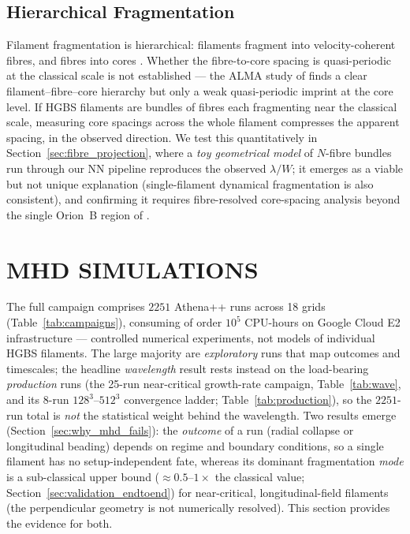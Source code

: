 \documentclass[usenatbib,twoside,twocolumn]{mnras}
\begin{document}
\subsection{Hierarchical Fragmentation}

Filament fragmentation is hierarchical: filaments fragment into velocity-coherent fibres, and fibres into cores \citep{Hacar2013,Hacar2018,Yang2024}. Whether the fibre-to-core spacing is quasi-periodic at the classical scale is not established --- the ALMA study of \citet{Yang2024} finds a clear filament--fibre--core hierarchy but only a weak quasi-periodic imprint at the core level. If HGBS filaments are bundles of fibres each fragmenting near the classical scale, measuring core spacings across the whole filament compresses the apparent spacing, in the observed direction. We test this quantitatively in Section~\ref{sec:fibre_projection}, where a \emph{toy geometrical model} of $N$-fibre bundles run through our NN pipeline reproduces the observed $\lambda/W$; it emerges as a viable but not unique explanation (single-filament dynamical fragmentation is also consistent), and confirming it requires fibre-resolved core-spacing analysis beyond the single Orion~B region of \citet{Yang2024}.

\section{MHD SIMULATIONS}

The full campaign comprises $2251$ Athena++ runs across 18 grids (Table~\ref{tab:campaigns}), consuming of order $10^5$ CPU-hours on Google Cloud E2 infrastructure --- controlled numerical experiments, not models of individual HGBS filaments. The large majority are \emph{exploratory} runs that map outcomes and timescales; the headline \emph{wavelength} result rests instead on the load-bearing \emph{production} runs (the 25-run near-critical growth-rate campaign, Table~\ref{tab:wave}, and its 8-run $128^3$--$512^3$ convergence ladder; Table~\ref{tab:production}), so the $2251$-run total is \emph{not} the statistical weight behind the wavelength. Two results emerge (Section~\ref{sec:why_mhd_fails}): the \emph{outcome} of a run (radial collapse or longitudinal beading) depends on regime and boundary conditions, so a single filament has no setup-independent fate, whereas its dominant fragmentation \emph{mode} is a sub-classical upper bound ($\approx0.5$--$1\times$ the classical value; Section~\ref{sec:validation_endtoend}) for near-critical, longitudinal-field filaments (the perpendicular geometry is not numerically resolved). This section provides the evidence for both.
\end{document}
